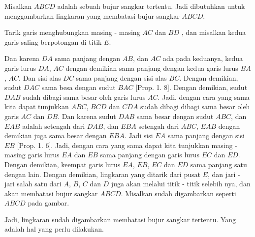 \documentclass[a4paper]{book}
\begin{document}
Misalkan $ABCD$ adalah sebuah bujur sangkar tertentu. Jadi dibutuhkan 
untuk menggambarkan lingkaran yang membatasi bujur sangkar $ABCD$.

Tarik garis menghubungkan masing - masing $AC$ dan $BD$ , dan misalkan
kedua garis saling berpotongan di titik $E$.

Dan karena $DA$ sama panjang dengan $AB$, dan $AC$ ada pada keduanya, 
kedua garis lurus $DA$, $AC$ dengan demikian sama panjang dengan kedua 
garis lurus $BA$, $AC$. Dan sisi alas $DC$ sama panjang dengan sisi alas
$BC$. Dengan demikian, sudut $DAC$ sama besa dengan sudut $BAC$ [Prop. 1. 8]. Dengan demikian, sudut $DAB$ sudah dibagi sama besar oleh garis lurus 
$AC$. Jadi, dengan cara yang sama kita dapat tunjukkan $ABC$, $BCD$ dan 
$CDA$ sudah dibagi dibagi sama besar oleh garis $AC$ dan $DB$. Dan karena
sudut $DAB$ sama besar dengan sudut $ABC$, dan $EAB$ adalah setengah
dari $DAB$, dan $EBA$ setengah dari $ABC$, $EAB$ dengan demikian juga
sama besar dengan $EBA$. Jadi sisi $EA$ sama panjang dengan sisi $EB$
[Prop. 1. 6]. Jadi, dengan cara yang sama dapat kita tunjukkan masing -
masing garis lurus $EA$ dan $EB$ sama panjang dengan garis lurus $EC$ dan
$ED$. Dengan demikian, keempat garis lurus $EA$, $EB$, $EC$ dan $ED$ sama
panjang satu dengan lain. Dengan demikian, lingkaran yang ditarik dari
pusat $E$, dan jari - jari salah satu dari $A$, $B$, $C$ dan $D$ juga
akan melalui titik - titik selebih nya, dan akan membatasi bujur sangkar
$ABCD$. Misalkan sudah digambarkan seperti $ABCD$ pada gambar.

Jadi, lingkaran sudah digambarkan membatasi bujur sangkar tertentu.
Yang adalah hal yang perlu dilakukan.  

\end{document}
